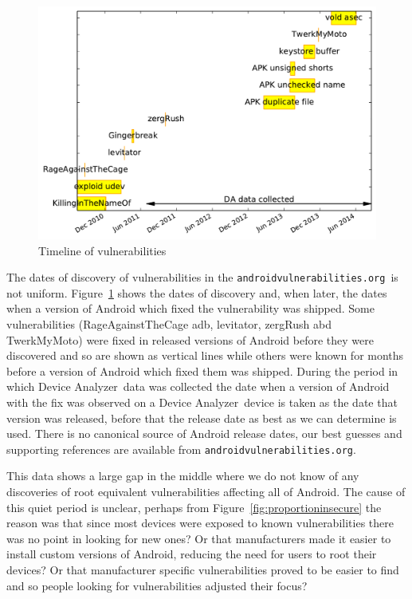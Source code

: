\documentclass[conference,a4paper,twoside]{IEEEtran}
\newcommand{\da}{Device Analyzer}
\newcommand{\avo}{\texttt{androidvulnerabilities.org}}
\begin{document}
\begin{figure}
 \centering
 \includegraphics[width=\columnwidth]{figures/vulnerabilities_timeline}
 \caption{Timeline of vulnerabilities}
 \label{fig:vulnerabilities_timeline}
\end{figure}

The dates of discovery of vulnerabilities in the \avo\ is not uniform.
Figure~\ref{fig:vulnerabilities_timeline} shows the dates of discovery and, when later, the dates when a version of Android which fixed the vulnerability was shipped.
Some vulnerabilities (RageAgainstTheCage adb, levitator, zergRush abd TwerkMyMoto) were fixed in released versions of Android before they were discovered and so are shown as vertical lines while others were known for months before a version of Android which fixed them was shipped.
During the period in which \da\ data was collected the date when a version of Android with the fix was observed on a \da\ device is taken as the date that version was released, before that the release date as best as we can determine is used.
There is no canonical source of Android release dates, our best guesses and supporting references are available from \avo.

This data shows a large gap in the middle where we do not know of any discoveries of root equivalent vulnerabilities affecting all of Android.
The cause of this quiet period is unclear, perhaps from Figure~\ref{fig:proportioninsecure} the reason was that since most devices were exposed to known vulnerabilities there was no point in looking for new ones?
Or that manufacturers made it easier to install custom versions of Android, reducing the need for users to root their devices?
Or that manufacturer specific vulnerabilities proved to be easier to find and so people looking for vulnerabilities adjusted their focus?
\end{document}
